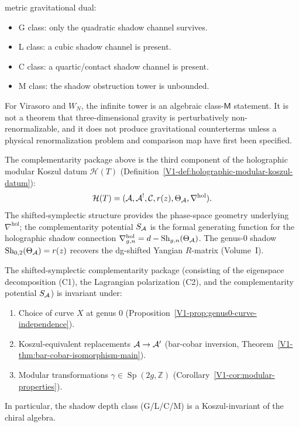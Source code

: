 \begin{remark}
metric gravitational dual:
\begin{itemize}
\item G class: only the quadratic shadow channel survives.
\item L class: a cubic shadow channel is present.
\item C class: a quartic/contact shadow channel is present.
\item M class: the shadow obstruction tower is unbounded.
\end{itemize}
For Virasoro and \(W_N\), the infinite tower is an algebraic
class-\(\mathsf M\) statement.  It is not a theorem that
three-dimensional gravity is perturbatively non-renormalizable, and it
does not produce gravitational counterterms unless a physical
renormalization problem and comparison map have first been specified.
\end{remark}

\begin{remark}
The complementarity package above is the third component of
the holographic modular Koszul datum $\mathcal{H}(T)$
(Definition~\ref{V1-def:holographic-modular-koszul-datum}):
\[
\mathcal{H}(T) = (\mathcal{A}, \mathcal{A}^!, \mathcal{C}, r(z), \Theta_{\mathcal{A}},
\nabla^{\mathrm{hol}}).
\]
The shifted-symplectic structure provides the phase-space
geometry underlying $\nabla^{\mathrm{hol}}$; the
complementarity potential $S_{\mathcal{A}}$ is the formal generating
function for the holographic shadow connection
$\nabla_{g,n}^{\mathrm{hol}} = d - \mathrm{Sh}_{g,n}(\Theta_{\mathcal{A}})$.
The genus-$0$ shadow $\mathrm{Sh}_{0,2}(\Theta_{\mathcal{A}}) = r(z)$ recovers
the dg-shifted Yangian $R$-matrix
(Volume~I).
\end{remark}

\begin{theorem}
The shifted-symplectic complementarity package (consisting
of the eigenspace decomposition \textup{(C1)}, the Lagrangian
polarization \textup{(C2)}, and the complementarity potential
$S_{\mathcal{A}}$) is invariant under:
\begin{enumerate}[label=\textup{(\roman*)}]
\item Choice of curve $X$ at genus $0$
 \textup{(}Proposition~\textup{\ref{V1-prop:genus0-curve-independence})}.
\item Koszul-equivalent replacements $\mathcal{A} \to \mathcal{A}'$
 \textup{(}bar-cobar inversion,
 Theorem~\textup{\ref*{V1-thm:bar-cobar-isomorphism-main})}.
\item Modular transformations $\gamma \in
 \operatorname{Sp}(2g, \mathbb{Z})$
 \textup{(}Corollary~\textup{\ref{V1-cor:modular-properties})}.
\end{enumerate}
In particular, the shadow depth class \textup{(G/L/C/M)} is a
Koszul-invariant of the chiral algebra.
\end{theorem}


